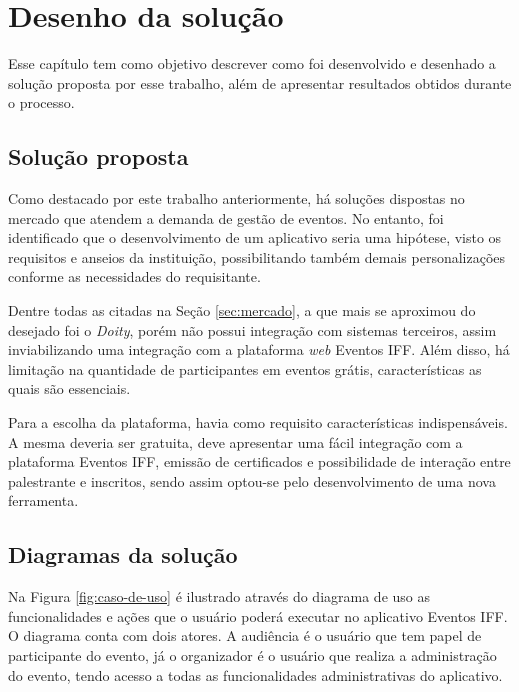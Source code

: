 \chapter{Desenho da solução}

Esse capítulo tem como objetivo descrever como foi desenvolvido e desenhado a solução proposta por esse trabalho, além de apresentar resultados obtidos durante o processo.

\section{Solução proposta}

Como destacado por este trabalho anteriormente, há soluções dispostas no mercado que atendem a demanda de gestão de eventos. No entanto, foi identificado que o desenvolvimento de um aplicativo seria uma hipótese, visto os requisitos e anseios da instituição, possibilitando também demais personalizações conforme as necessidades do requisitante.

Dentre todas as citadas na Seção \ref{sec:mercado}, a que mais se aproximou do desejado foi o \textit{Doity}, porém não possui integração com sistemas terceiros, assim inviabilizando uma integração com a plataforma \textit{web} Eventos IFF. Além disso, há limitação na quantidade de participantes em eventos grátis, características as quais são essenciais.

Para a escolha da plataforma, havia como requisito características indispensáveis. A mesma deveria ser gratuita, deve apresentar uma fácil integração com a plataforma Eventos IFF, emissão de certificados e possibilidade de interação entre palestrante e inscritos, sendo assim optou-se pelo desenvolvimento de uma nova ferramenta.

\section{Diagramas da solução}

Na Figura \ref{fig:caso-de-uso} é ilustrado através do diagrama de uso as funcionalidades e ações que o usuário poderá executar no aplicativo Eventos IFF. O diagrama conta com dois atores. A audiência é o usuário que tem papel de participante do evento, já o organizador é o usuário que realiza a administração do evento, tendo acesso a todas as funcionalidades administrativas do aplicativo.

